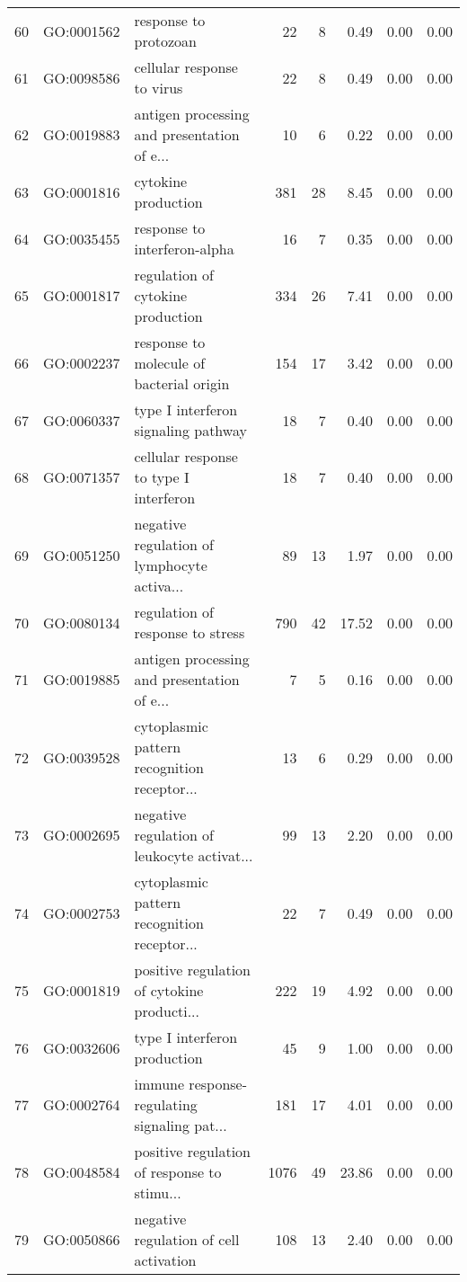 \begin{table}[ht]
\begin{tabular}{rllrrrrr}
  60 & GO:0001562 & response to protozoan &  22 &   8 & 0.49 & 0.00 & 0.00 \\ 
  61 & GO:0098586 & cellular response to virus &  22 &   8 & 0.49 & 0.00 & 0.00 \\ 
  62 & GO:0019883 & antigen processing and presentation of e... &  10 &   6 & 0.22 & 0.00 & 0.00 \\ 
  63 & GO:0001816 & cytokine production & 381 &  28 & 8.45 & 0.00 & 0.00 \\ 
  64 & GO:0035455 & response to interferon-alpha &  16 &   7 & 0.35 & 0.00 & 0.00 \\ 
  65 & GO:0001817 & regulation of cytokine production & 334 &  26 & 7.41 & 0.00 & 0.00 \\ 
  66 & GO:0002237 & response to molecule of bacterial origin & 154 &  17 & 3.42 & 0.00 & 0.00 \\ 
  67 & GO:0060337 & type I interferon signaling pathway &  18 &   7 & 0.40 & 0.00 & 0.00 \\ 
  68 & GO:0071357 & cellular response to type I interferon &  18 &   7 & 0.40 & 0.00 & 0.00 \\ 
  69 & GO:0051250 & negative regulation of lymphocyte activa... &  89 &  13 & 1.97 & 0.00 & 0.00 \\ 
  70 & GO:0080134 & regulation of response to stress & 790 &  42 & 17.52 & 0.00 & 0.00 \\ 
  71 & GO:0019885 & antigen processing and presentation of e... &   7 &   5 & 0.16 & 0.00 & 0.00 \\ 
  72 & GO:0039528 & cytoplasmic pattern recognition receptor... &  13 &   6 & 0.29 & 0.00 & 0.00 \\ 
  73 & GO:0002695 & negative regulation of leukocyte activat... &  99 &  13 & 2.20 & 0.00 & 0.00 \\ 
  74 & GO:0002753 & cytoplasmic pattern recognition receptor... &  22 &   7 & 0.49 & 0.00 & 0.00 \\ 
  75 & GO:0001819 & positive regulation of cytokine producti... & 222 &  19 & 4.92 & 0.00 & 0.00 \\ 
  76 & GO:0032606 & type I interferon production &  45 &   9 & 1.00 & 0.00 & 0.00 \\ 
  77 & GO:0002764 & immune response-regulating signaling pat... & 181 &  17 & 4.01 & 0.00 & 0.00 \\ 
  78 & GO:0048584 & positive regulation of response to stimu... & 1076 &  49 & 23.86 & 0.00 & 0.00 \\ 
  79 & GO:0050866 & negative regulation of cell activation & 108 &  13 & 2.40 & 0.00 & 0.00 \\ 

\end{tabular}
\end{table}
